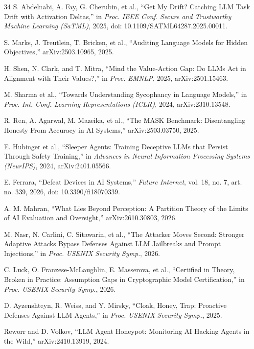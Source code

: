 \begin{thebibliography}{34}
S. Abdelnabi, A. Fay, G. Cherubin, et al., ``Get My Drift? Catching LLM Task
Drift with Activation Deltas,'' in \emph{Proc. IEEE Conf. Secure and
Trustworthy Machine Learning (SaTML)}, 2025, doi:
10.1109/SATML64287.2025.00011.

S. Marks, J. Treutlein, T. Bricken, et al., ``Auditing Language Models for
Hidden Objectives,'' arXiv:2503.10965, 2025.

H. Shen, N. Clark, and T. Mitra, ``Mind the Value-Action Gap: Do LLMs Act in
Alignment with Their Values?,'' in \emph{Proc. EMNLP}, 2025, arXiv:2501.15463.

M. Sharma et al., ``Towards Understanding Sycophancy in Language Models,'' in
\emph{Proc. Int. Conf. Learning Representations (ICLR)}, 2024,
arXiv:2310.13548.

R. Ren, A. Agarwal, M. Mazeika, et al., ``The MASK Benchmark: Disentangling
Honesty From Accuracy in AI Systems,'' arXiv:2503.03750, 2025.

E. Hubinger et al., ``Sleeper Agents: Training Deceptive LLMs that Persist
Through Safety Training,'' in \emph{Advances in Neural Information Processing
Systems (NeurIPS)}, 2024, arXiv:2401.05566.

E. Ferrara, ``Defeat Devices in AI Systems,'' \emph{Future Internet}, vol. 18,
no. 7, art. no. 339, 2026, doi: 10.3390/fi18070339.

A. M. Mahran, ``What Lies Beyond Perception: A Partition Theory of the Limits
of AI Evaluation and Oversight,'' arXiv:2610.30803, 2026.

M. Nasr, N. Carlini, C. Sitawarin, et al., ``The Attacker Moves Second:
Stronger Adaptive Attacks Bypass Defenses Against LLM Jailbreaks and Prompt
Injections,'' in \emph{Proc. USENIX Security Symp.}, 2026.

C. Luck, O. Franzese-McLaughlin, E. Masserova, et al., ``Certified in Theory,
Broken in Practice: Assumption Gaps in Cryptographic Model Certification,''
in \emph{Proc. USENIX Security Symp.}, 2026.

D. Ayzenshteyn, R. Weiss, and Y. Mirsky, ``Cloak, Honey, Trap: Proactive
Defenses Against LLM Agents,'' in \emph{Proc. USENIX Security Symp.}, 2025.

Reworr and D. Volkov, ``LLM Agent Honeypot: Monitoring AI Hacking Agents in
the Wild,'' arXiv:2410.13919, 2024.


\end{thebibliography}
